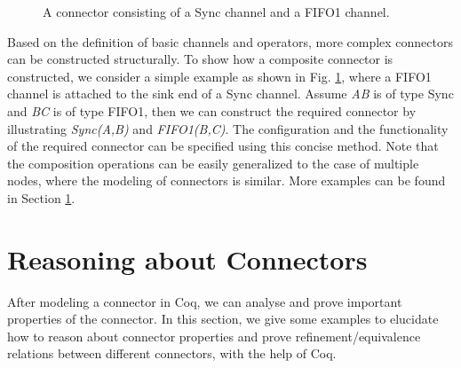 \documentclass[3p,times]{elsarticle}
\begin{document}
\begin{figure}
\vspace{0cm}
\centering
{}
\caption{A connector consisting of a Sync channel and a FIFO1 channel.}\label{fig:compsyncfifo}
\end{figure}

Based on the definition of basic channels and operators, more complex connectors can be constructed structurally.
To show how a composite connector is constructed, we consider a simple example as shown in Fig. \ref{fig:compsyncfifo}, where a FIFO1 channel is attached
to the sink end of a Sync channel. Assume \emph{AB} is of type Sync and \emph{BC} is of type FIFO1, then we can construct the required connector by
illustrating \emph{Sync(A,B)} and \emph{FIFO1(B,C)}. The configuration and the functionality of the required connector can be specified using this concise method. Note that the composition operations can be easily generalized to the case of multiple nodes, where the modeling of connectors is similar. More
examples can be found in Section \ref{sec:verification}.






\section{Reasoning about Connectors}\label{sec:verification}
After modeling a connector in Coq, we can analyse and prove important properties of the connector. In this section, we give some examples to elucidate how to
reason about connector properties and prove refinement/equivalence relations between different connectors, with the help of Coq.
\end{document}
